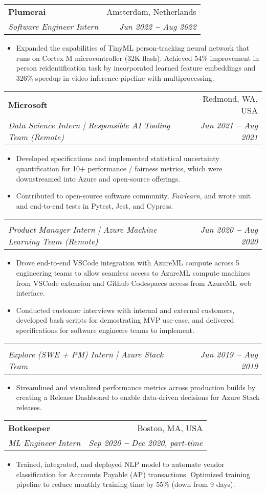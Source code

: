 \documentclass[letterpaper,11pt]{article}
\makeatletter
\newcommand{\resumeItem}[1]{
  \item\small{
    {#1 \vspace{-2pt}}
  }
}
\newcommand{\resumeSubheading}[4]{
  \vspace{-2pt}\item
    \begin{tabular*}{0.97\textwidth}[t]{l@{\extracolsep{\fill}}r}
      \textbf{#1} & #2 \\
      \textit{\small#3} & \textit{\small #4} \\
    \end{tabular*}\vspace{-7pt}
}
\newcommand{\resumeItemListStart}{\begin{itemize}}
\newcommand{\resumeItemListEnd}{\end{itemize}\vspace{-5pt}}
\makeatother
\begin{document}
    \resumeSubheading
      {Plumerai}{Amsterdam, Netherlands}
      {Software Engineer Intern}{Jun 2022 \textbf{--} Aug 2022}
        \resumeItemListStart
            \resumeItem{Expanded the capabilities of TinyML person-tracking neural network that runs on Cortex M microcontroller (32K flash). Achieved 54\% improvement in person reidentification task by incorporated learned feature embeddings and 326\% speedup in video inference pipeline with multiprocessing. }
        \resumeItemListEnd

    \resumeSubheading
      {Microsoft}{Redmond, WA, USA}
      {Data Science Intern | Responsible AI Tooling Team (Remote)}{Jun 2021 \textbf{--} Aug 2021}
        \resumeItemListStart
            \resumeItem{Developed specifications and implemented statistical uncertainty quantification for 10+ performance / fairness metrics, which were downstreamed into Azure and open-source offerings.}
            \resumeItem{Contributed to open-source software community, \textit{Fairlearn}, and wrote unit and end-to-end tests in Pytest, Jest, and Cypress.}
        \resumeItemListEnd

    \vspace{-16pt}
    
    \resumeSubheading
      {}{}
      {Product Manager Intern | Azure Machine Learning Team (Remote)}{Jun 2020 \textbf{--} Aug 2020}
      \resumeItemListStart
      \resumeItem{Drove end-to-end VSCode integration with AzureML compute across 5 engineering teams to allow seamless access to AzureML compute machines from VSCode extension and Github Codespaces access from AzureML web interface.}
      \resumeItem{Conducted customer interviews with internal and external customers, developed bash scripts for demostrating MVP use-case, and delivered specifications for software engineers teams to implement.}
    \resumeItemListEnd

    \vspace{-16pt}
    
    \resumeSubheading
      {}{}
      {Explore (SWE + PM) Intern | Azure Stack Team }{Jun 2019 \textbf{--} Aug 2019}
      \resumeItemListStart
            \resumeItem{Streamlined and visualized performance metrics across production builds by creating a Release Dashboard to
            enable data-driven decisions for Azure Stack releases.}
        \resumeItemListEnd
      
    
    \resumeSubheading
      {Botkeeper}{Boston, MA, USA}
      {ML Engineer Intern}{Sep 2020 \textbf{--} Dec 2020, part-time}
        \resumeItemListStart
            \resumeItem{Trained, integrated, and deployed NLP model to automate vendor classification for Acccounts Payable (AP) transactions. Optimized training pipeline to reduce monthly training time by 55\% (down from 9 days).}
        \resumeItemListEnd
      
\end{document}
